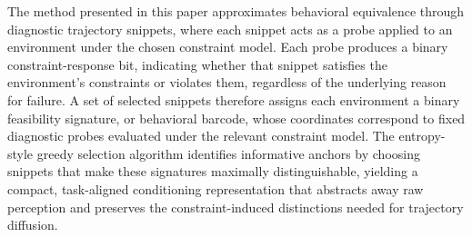 The method presented in this paper approximates behavioral equivalence through diagnostic trajectory snippets, where each snippet acts as a probe applied to an environment under the chosen constraint model.
Each probe produces a binary constraint-response bit, indicating whether that snippet satisfies the environment’s constraints or violates them, regardless of the underlying reason for failure.
A set of selected snippets therefore assigns each environment a binary feasibility signature, or behavioral barcode, whose coordinates correspond to fixed diagnostic probes evaluated under the relevant constraint model.
The entropy-style greedy selection algorithm identifies informative anchors by choosing snippets that make these signatures maximally distinguishable, yielding a compact, task-aligned conditioning representation that abstracts away raw perception and preserves the constraint-induced distinctions needed for trajectory diffusion.
